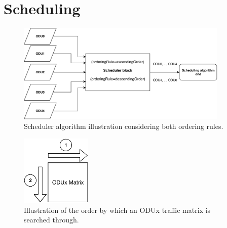 \section{Scheduling}
\label{scheduling2}

\begin{figure}[H]
  \begin{center}
    \includegraphics[width=0.9\textwidth]{fig/logos/schedulerAscending.pdf}
    \caption{Scheduler algorithm illustration considering both ordering rules.}
  \end{center}
  \label{schedulerAscending}
\end{figure}

\begin{figure}[H]
  \begin{center}
    \includegraphics[width=0.3\textwidth]{fig/logos/scheduler2.pdf}
    \caption{Illustration of the order by which an ODUx traffic matrix is searched through.}
    \label{scheduler2}
  \end{center}
\end{figure}

